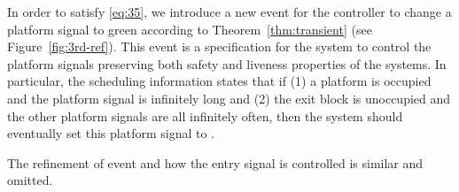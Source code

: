 In order to satisfy \ref{eq:35}, we introduce a new event
\ctrlplf for the controller to change a platform signal to green according to
Theorem~\ref{thm:transient} (see Figure~\ref{fig:3rd-ref}).
This event \ctrlplf is a specification for the system to control the
platform signals preserving both safety and liveness properties of the
systems.  In particular, the scheduling information states that if (1)
a platform is occupied and the platform signal is \RED infinitely long
and (2) the exit block is unoccupied and the other platform signals
are all \RED infinitely often, then the system should eventually set
this platform signal to \GREEN.

The refinement of event \movein and how the entry signal is controlled
is similar and omitted.


